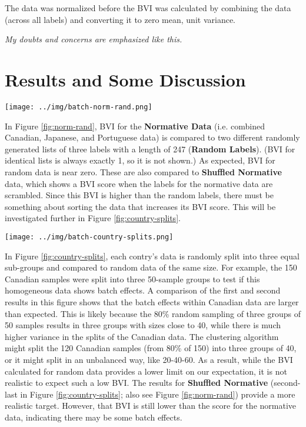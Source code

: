 \documentclass[12pt]{article}
\begin{document}
The data was normalized before the BVI was calculated by combining the data (across all labels) and converting it to zero mean, unit variance.

\emph{My doubts and concerns are emphasized like this.}

\pagebreak

\section*{Results and Some Discussion}

\begin{figure*}[ht]
  \centering
       \texttt{[image: ../img/batch-norm-rand.png]}
         \caption{}
  \label{fig:norm-rand}
\end{figure*}

In Figure \ref{fig:norm-rand}, BVI for the \textbf{Normative Data} (i.e. combined Canadian, Japanese, and Portuguese data) is compared to two different randomly generated lists of three labels with a length of 247 (\textbf{Random Labels}). (BVI for identical lists is always exactly 1, so it is not shown.) As expected, BVI for random data is near zero. These are also compared to \textbf{Shuffled Normative} data, which shows a BVI score when the labels for the normative data are scrambled. Since this BVI is higher than the random labels, there must be something about sorting the data that increases its BVI score. This will be investigated further in Figure \ref{fig:country-splits}.

\pagebreak

\begin{figure*}
  \centering
       \texttt{[image: ../img/batch-country-splits.png]}
         \caption{}
  \label{fig:country-splits}
\end{figure*}

In Figure \ref{fig:country-splits}, each contry's data is randomly split into three equal sub-groups and compared to random data of the same size. For example, the 150 Canadian samples were split into three 50-sample groups to test if this homogeneous data shows batch effects. A comparison of the first and second results in this figure shows that the batch effects within Canadian data are larger than expected. This is likely because the 80\% random sampling of three groups of 50 samples results in three groups with sizes close to 40, while there is much higher variance in the splits of the Canadian data. The clustering algorithm might split the 120 Canadian samples (from 80\% of 150) into three groups of 40, or it might split in an unbalanced way, like 20-40-60. As a result, while the BVI calculated for random data provides a lower limit on our expectation, it is not realistic to expect such a low BVI. The results for \textbf{Shuffled Normative} (second-last in Figure \ref{fig:country-splits}; also see Figure \ref{fig:norm-rand}) provide a more realistic target. However, that BVI is still lower than the score for the normative data, indicating there may be some batch effects.
\end{document}
